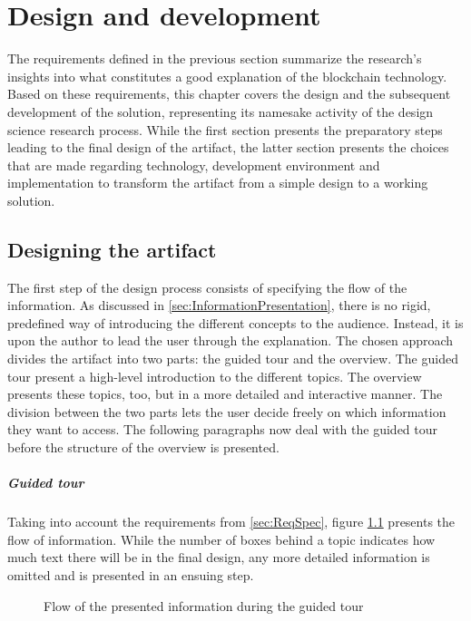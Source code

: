 \chapter{Design and development} \label{chap:designanddev}
The requirements defined in the previous section summarize the research's insights into what constitutes a good explanation of the blockchain technology. Based on these requirements, this chapter covers the design and the subsequent development of the solution, representing its namesake activity of the design science research process. While the first section presents the preparatory steps leading to the final design of the artifact, the latter section presents the choices that are made regarding technology, development environment and implementation to transform the artifact from a simple design to a working solution.

\section{Designing the artifact} \label{sec:ArtifactDesign}
The first step of the design process consists of specifying the flow of the information. As discussed in \ref{sec:InformationPresentation}, there is no rigid, predefined way of introducing the different concepts to the audience. Instead, it is upon the author to lead the user through the explanation. The chosen approach divides the artifact into two parts: the guided tour and the overview. The guided tour present a high-level introduction to the different topics. The overview presents these topics, too, but in a more detailed and interactive manner. The division between the two parts lets the user decide freely on which information they want to access. The following paragraphs now deal with the guided tour before the structure of the overview is presented.

\paragraph{Guided tour} Taking into account the requirements from \ref{sec:ReqSpec}, figure \ref{fig:DesignConcept} presents the flow of information. %
While the number of boxes behind a topic indicates how much text there will be in the final design, any more detailed information is omitted and is presented in an ensuing step. 

\begin{figure}
 \centering
 
 \caption{Flow of the presented information during the guided tour}
    \label{fig:DesignConcept}
\end{figure}

